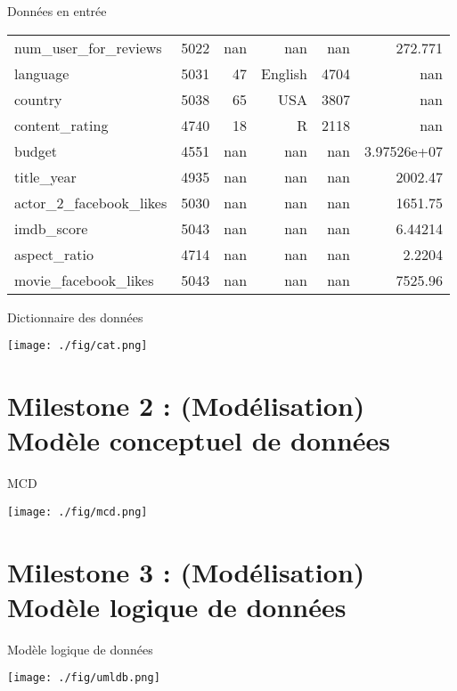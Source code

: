\documentclass[french]{beamer}
\begin{document}
\begin{frame}[label={sec:org45241b8},shrink=20]{Données en entrée}
\begin{center}
\begin{tabular}{lrrrrr}
num\_user\_for\_reviews & 5022 & nan & nan & nan & 272.771\\
language & 5031 & 47 & English & 4704 & nan\\
country & 5038 & 65 & USA & 3807 & nan\\
content\_rating & 4740 & 18 & R & 2118 & nan\\
budget & 4551 & nan & nan & nan & 3.97526e+07\\
title\_year & 4935 & nan & nan & nan & 2002.47\\
actor\_2\_facebook\_likes & 5030 & nan & nan & nan & 1651.75\\
imdb\_score & 5043 & nan & nan & nan & 6.44214\\
aspect\_ratio & 4714 & nan & nan & nan & 2.2204\\
movie\_facebook\_likes & 5043 & nan & nan & nan & 7525.96\\
\end{tabular}
\end{center}
\end{frame}

\begin{frame}[label={sec:orgd9a5857}]{Dictionnaire des données}
\begin{center}
\texttt{[image: ./fig/cat.png]}
\end{center}
\end{frame}


\section{Milestone 2 : (Modélisation) Modèle conceptuel de données}
\label{sec:org67d6240}
\begin{frame}[label={sec:org7f57c89}]{MCD}
\begin{center}
\texttt{[image: ./fig/mcd.png]}
\end{center}
\end{frame}


\section{Milestone 3 : (Modélisation) Modèle logique de données}
\label{sec:orge866a38}
\begin{frame}[label={sec:org067e138}]{Modèle logique de données}
\begin{center}
\texttt{[image: ./fig/umldb.png]}
\end{center}
\end{frame}
\end{document}

